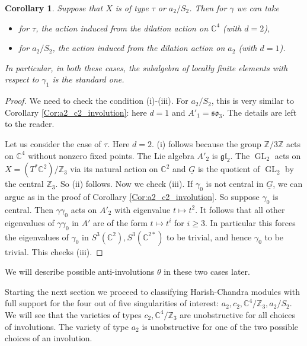 \documentclass[12pt]{amsart}
\newcommand{\C}{\mathbb{C}}
\newcommand{\Z}{\mathbb{Z}}
\newtheorem{Cor}[Thm]{Corollary}
\theoremstyle{definition}
\numberwithin{equation}{section}
\begin{document}
\begin{Cor}\label{Cor:tau_a_2S_2_involution}
Suppose that $X$ is of type $\tau$ or $a_2/S_2$. Then for $\gamma$
we can take
\begin{itemize}
\item for $\tau$, the action induced from the dilation action on $\C^4$ (with $d=2$),
\item for $a_2/S_2$, the action induced from the dilation action on $a_2$ (with $d=1$).
\end{itemize}
In particular, in both these cases, the subalgebra of locally finite elements with respect
to $\gamma_1$ is the standard one.
\end{Cor}
\begin{proof}
We need to check the condition (i)-(iii). For $a_2/S_2$, this is very similar to  
Corollary \ref{Cor:a2_c2_involution}: here $d=1$ and $A'_1=\mathfrak{so}_3$. The details are left to the reader. 

Let us consider the case of $\tau$. Here $d=2$. (i) follows because the group $\Z/3\Z$ acts on $\C^4$ without nonzero fixed points.  
The Lie algebra $A'_2$ is $\mathfrak{gl}_2$. The $\operatorname{GL}_2$ acts on $X=(T^*\C^2)/\Z_3$
via its natural action on $\C^2$ and $\underline{G}$ is the quotient of $\operatorname{GL}_2$ by the central $\Z_3$. 
So (ii) follows. Now we check (iii). If $\gamma_0$ is not central in $\underline{G}$, we can argue as 
in the proof of Corollary \ref{Cor:a2_c2_involution}. So suppose $\gamma_0$ is central. 
Then $\gamma\gamma_0$ acts on $A'_2$ with eigenvalue $t\mapsto t^2$. It follows that all other eigenvalues
of $\gamma\gamma_0$ in $A'$ are of the form $t\mapsto t^i$ for $i\geqslant 3$. In particular this forces the eigenvalues 
of $\gamma_0$ in $S^3(\C^2), S^3(\C^{2*})$ to be trivial, and hence $\gamma_0$ to be trivial. This checks (iii).
\end{proof}

We will describe possible anti-involutions $\theta$ in these two cases later.

Starting the next section we proceed to classifying Harish-Chandra modules with full support
for the four out of five singularities of interest: $a_2,c_2,\C^4/\mathbb{Z}_3, a_2/S_2$.
We will see that the varieties of types $c_2,\C^4/\mathbb{Z}_3$ are unobstructive for all
choices of involutions. The variety of type $a_2$ is unobstructive for one of the two possible
choices of an involution.
\end{document}
